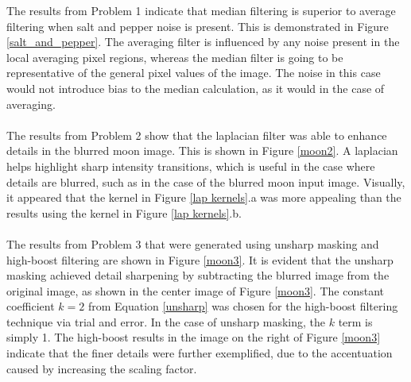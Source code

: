 \documentclass[./rarnold_report3.tex]{subfiles}
\begin{document}
\noindent The results from Problem 1 indicate that median filtering is superior to average filtering when salt and pepper noise is present.  This is demonstrated in Figure \ref{salt_and_pepper}.  The averaging filter is influenced by any noise present in the local averaging pixel regions, whereas the median filter is going to be representative of the general pixel values of the image.  The noise in this case would not introduce bias to the median calculation, as it would in the case of averaging.  
\\ \\
\noindent The results from Problem 2 show that the laplacian filter was able to enhance details in the blurred moon image.  This is shown in Figure \ref{moon2}.  A laplacian helps highlight sharp intensity transitions, which is useful in the case where details are blurred, such as in the case of the blurred moon input image.  Visually, it appeared that the kernel in Figure \ref{lap kernels}.a was more appealing than the results using the kernel in Figure \ref{lap kernels}.b.
\\ \\
\noindent The results from Problem 3 that were generated using unsharp masking and high-boost filtering are shown in Figure \ref{moon3}. It is evident that the unsharp masking achieved detail sharpening by subtracting the blurred image from the original image, as shown in the center image of Figure \ref{moon3}.  The constant coefficient $k=2$ from Equation \eqref{unsharp} was chosen for the high-boost filtering technique via trial and error.  In the case of unsharp masking, the $k$ term is simply 1.  The high-boost results in the image on the right of Figure \ref{moon3} indicate that the finer details were further exemplified, due to the accentuation caused by increasing the scaling factor.  
\\ \\
\end{document}
